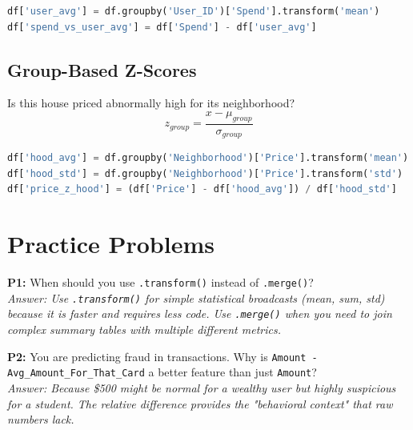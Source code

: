 \documentclass{article}
\begin{document}
\begin{lstlisting}[language=Python]
df['user_avg'] = df.groupby('User_ID')['Spend'].transform('mean')
df['spend_vs_user_avg'] = df['Spend'] - df['user_avg']
\end{lstlisting}

\subsection{Group-Based Z-Scores}
Is this house priced abnormally high for its neighborhood?
\begin{equation}
    z_{group} = \frac{x - \mu_{group}}{\sigma_{group}}
\end{equation}

\begin{lstlisting}[language=Python]
df['hood_avg'] = df.groupby('Neighborhood')['Price'].transform('mean')
df['hood_std'] = df.groupby('Neighborhood')['Price'].transform('std')
df['price_z_hood'] = (df['Price'] - df['hood_avg']) / df['hood_std']
\end{lstlisting}

\section{Practice Problems}
\textbf{P1:} When should you use \texttt{.transform()} instead of \texttt{.merge()}? \\
\textit{Answer: Use \texttt{.transform()} for simple statistical broadcasts (mean, sum, std) because it is faster and requires less code. Use \texttt{.merge()} when you need to join complex summary tables with multiple different metrics.}

\textbf{P2:} You are predicting fraud in transactions. Why is \texttt{Amount - Avg\_Amount\_For\_That\_Card} a better feature than just \texttt{Amount}? \\
\textit{Answer: Because \$500 might be normal for a wealthy user but highly suspicious for a student. The relative difference provides the "behavioral context" that raw numbers lack.}
\end{document}
